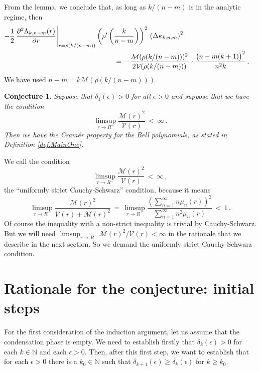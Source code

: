 \documentclass[12pt]{article}
\newtheorem{conj}[thm]{Conjecture}
\newcommand{\N}{\mathbb{N}}
\begin{document}
From the lemma, we conclude that, as long as $k/(n-m)$ is in the analytic regime, then
\begin{equation}
\label{eq:TaylorOne}
\begin{split}
 -\frac{1}{2}\, \frac{\partial^2 \Lambda_{k,n-m}(r)}{\partial r}\Bigg|_{r=\rho(k/(n-m))}
\left(\rho'\left(\frac{k}{n-m}\right)\right)^2\, \left(\Delta \kappa_{k,n,m}\right)^2\\
&\hspace{-3.5cm}=\, -\frac{\mathcal{M}(\rho(k/(n-m)))^2}{2 \mathcal{V}(\rho(k/(n-m)))}\,\cdot \frac{\big(n-m(k+1)\big)^2}{n^2k}\, .
\end{split}
\end{equation}
We have used $n-m = k \mathcal{M}(\rho(k/(n-m)))$.

\begin{conj}
Suppose that $\delta_1(\epsilon)>0$ for all $\epsilon>0$ and suppose that we have the condition
$$
\limsup_{r \to R^-} \frac{\mathcal{M}(r)^2}{\mathcal{V}(r)}\, <\, \infty\, .
$$
Then we have the Cram\'er  property for the Bell polynomials, as stated in Definition \ref{def:MainOne}.
\end{conj}

We call the condition
$$
\limsup_{r \to R^-} \frac{\mathcal{M}(r)^2}{\mathcal{V}(r)}\, <\, \infty\, ,
$$
the ``uniformly strict Cauchy-Schwarz'' condition, because it means
$$
\limsup_{r \to R^-}  \frac{\mathcal{M}(r)^2}{\mathcal{V}(r) +\mathcal{M}(r)^2}\, =\, 
\limsup_{r \to R^-} \frac{\left(\sum_{n=1}^{\infty} n \mu_n(r)\right)^2}{\sum_{n=1}^{\infty} n^2 \mu_n(r)}\, <\, 1\, .
$$
Of course the inequality with a non-strict inequality is trivial by Cauchy-Schwarz.
But we will need $\limsup_{r \to R^-} \mathcal{M}(r)^2/\mathcal{V}(r)<\infty$
in the rationale that we describe in the next section.
So we demand the uniformly strict Cauchy-Schwarz condition.

\section{Rationale for the conjecture: initial steps}

For the first consideration of the induction argument, let us assume that the condensation phase is empty.
We need to establish firstly that $\delta_k(\epsilon)>0$ for each $k \in \N$ and each $\epsilon>0$.
Then, after this first step, we want to establish that for each $\epsilon>0$ there is a $k_0 \in \N$ such that
$\delta_{k+1}(\epsilon) \geq \delta_k(\epsilon)$ for $k\geq k_0$.
\end{document}

